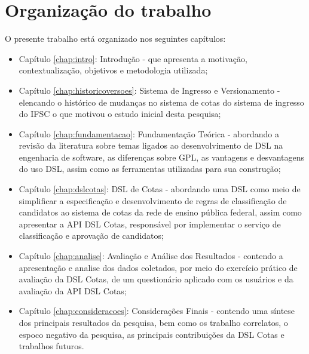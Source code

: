\section{Organização do trabalho}
\label{organizacao}

O presente trabalho está organizado nos seguintes capítulos:

\begin{itemize}
    \item Capítulo \ref{chap:intro}: Introdução - que apresenta a motivação, contextualização, objetivos e metodologia utilizada;
    \item Capítulo \ref{chap:historicoversoes}: Sistema de Ingresso e Versionamento - elencando o histórico de mudanças no sistema de cotas do sistema de ingresso do \gls{IFSC} o que motivou o estudo inicial desta pesquisa;
    \item Capítulo \ref{chap:fundamentacao}: Fundamentação Teórica - abordando a revisão da literatura sobre temas ligados ao desenvolvimento de \gls{DSL} na engenharia de software, as diferenças sobre \gls{GPL}, as vantagens e desvantagens do uso  \gls{DSL}, assim como as ferramentas utilizadas para sua construção;
    \item Capítulo \ref{chap:dslcotas}: DSL de Cotas - abordando uma \gls{DSL} como meio de simplificar a especificação e desenvolvimento de regras de classificação de candidatos ao sistema de cotas da rede de ensino pública federal, assim como apresentar a \gls{API} DSL Cotas, responsável por implementar o serviço de classificação e aprovação de candidatos;
    \item Capítulo \ref{chap:analise}: Avaliação e Análise dos Resultados - contendo a apresentação e analise dos dados coletados, por meio do exercício prático de avaliação da DSL Cotas, de um questionário aplicado com os usuários e da avaliação da
    \gls{API} DSL Cotas;
    \item Capítulo \ref{chap:consideracoes}: Considerações Finais - contendo uma síntese dos principais resultados da pesquisa, bem como os trabalho correlatos, o espoco negativo da pesquisa, as principais contribuições da DSL Cotas e trabalhos futuros.
\end{itemize}
